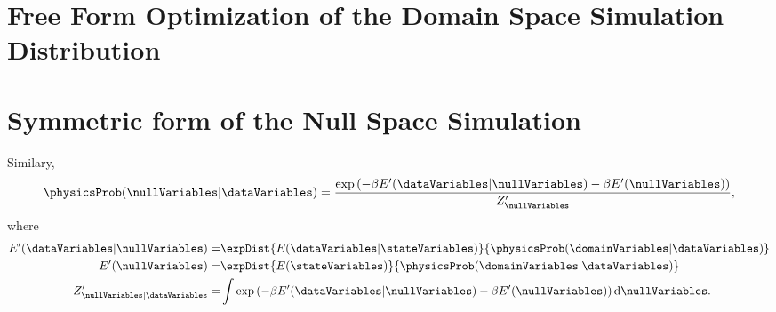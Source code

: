 \section{Free Form Optimization of the Domain Space Simulation Distribution} \label{sec-free-form-optimization-of-the-domain-space-simulation-distribution}

\section{Symmetric form of the Null Space Simulation}\label{sec-symmetric-form-of-the-null-space-simulation}

Similary, 
\[
\physicsProb(\nullVariables|\dataVariables) = \frac{\exp\left(-\beta E^\prime(\dataVariables |\nullVariables) - \beta E^\prime(\nullVariables)\right)}{Z^\prime_{\nullVariables}},
\] 
where 
\begin{align*}
E^\prime(\dataVariables |\nullVariables) = & \expDist{E(\dataVariables |\stateVariables)}{\physicsProb(\domainVariables|\dataVariables)} \\
E^\prime(\nullVariables) = & \expDist{E(\stateVariables)}{\physicsProb(\domainVariables|\dataVariables)} \\
Z^\prime_{\nullVariables | \dataVariables} = & \int \exp\left(-\beta E^\prime(\dataVariables |\nullVariables) - \beta E^\prime(\nullVariables)\right) \text{d}\nullVariables. 
\end{align*}

